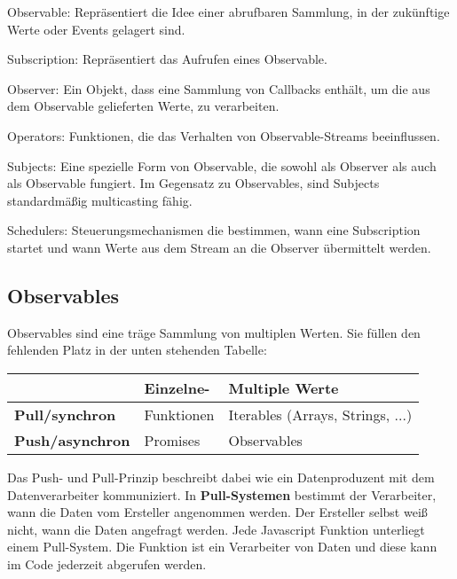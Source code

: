 \begin{description}
    \item Observable: Repräsentiert die Idee einer abrufbaren Sammlung, in der zukünftige Werte oder Events gelagert sind.
    \item Subscription: Repräsentiert das Aufrufen eines Observable.
    \item Observer: Ein Objekt, dass eine Sammlung von Callbacks enthält, um die aus dem Observable gelieferten Werte, zu verarbeiten.
    \item Operators: Funktionen, die das Verhalten von Observable-Streams beeinflussen.
    \item Subjects: Eine spezielle Form von Observable, die sowohl als Observer als auch als Observable fungiert. Im Gegensatz zu Observables, sind Subjects standardmäßig multicasting fähig.
    \item Schedulers: Steuerungsmechanismen die bestimmen, wann eine Subscription startet und wann Werte aus dem Stream an die Observer übermittelt werden.
\end{description}


\subsection{Observables}

Observables sind eine träge Sammlung von multiplen Werten. Sie füllen den fehlenden Platz in der unten stehenden Tabelle:

\begin{center}
    \begin{tabular}{| l | l | l |}
    \hline
    & \textbf{Einzelne-} & \textbf{Multiple Werte} \\ \hline
    \textbf{Pull/synchron} & Funktionen & Iterables (Arrays, Strings, ...) \\ \hline
    \textbf{Push/asynchron} & Promises & Observables  \\ \hline
    \end{tabular}
\end{center}

\noindent
Das Push- und Pull-Prinzip beschreibt dabei wie ein Datenproduzent mit dem Datenverarbeiter kommuniziert. In \textbf{Pull-Systemen} bestimmt der Verarbeiter, wann die Daten vom Ersteller angenommen werden. Der Ersteller selbst weiß nicht, wann die Daten angefragt werden. Jede Javascript Funktion unterliegt einem Pull-System. Die Funktion ist ein Verarbeiter von Daten und diese kann im Code jederzeit abgerufen werden.\\

